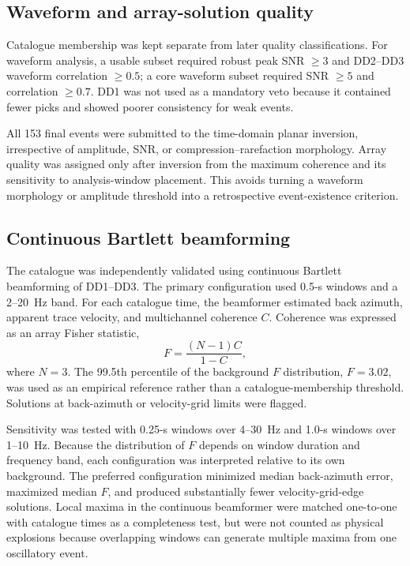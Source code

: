 \documentclass[]{seismica}
\begin{document}
\subsection{Waveform and array-solution quality}

Catalogue membership was kept separate from later quality classifications.
For waveform analysis, a usable subset required robust peak SNR $\geq3$ and
DD2--DD3 waveform correlation $\geq0.5$; a core waveform subset required SNR
$\geq5$ and correlation $\geq0.7$. DD1 was not used as a mandatory veto
because it contained fewer picks and showed poorer consistency for weak
events.

All 153 final events were submitted to the time-domain planar inversion,
irrespective of amplitude, SNR, or compression--rarefaction morphology. Array
quality was assigned only after inversion from the maximum coherence and its
sensitivity to analysis-window placement. This avoids turning a waveform
morphology or amplitude threshold into a retrospective event-existence
criterion.

\subsection{Continuous Bartlett beamforming}

The catalogue was independently validated using continuous Bartlett
beamforming of DD1--DD3. The primary configuration used 0.5-s windows and a
2--20~Hz band. For each catalogue time, the beamformer estimated back azimuth,
apparent trace velocity, and multichannel coherence $C$. Coherence was
expressed as an array Fisher statistic,
\begin{equation}
  F=\frac{(N-1)C}{1-C},
  \label{eq:f_statistic}
\end{equation}
where $N=3$. The 99.5th percentile of the background $F$ distribution,
$F=3.02$, was used as an empirical reference rather than a catalogue-membership
threshold. Solutions at back-azimuth or velocity-grid limits were flagged.

Sensitivity was tested with 0.25-s windows over 4--30~Hz and 1.0-s windows
over 1--10~Hz. Because the distribution of $F$ depends on window duration and
frequency band, each configuration was interpreted relative to its own
background. The preferred configuration minimized median back-azimuth error,
maximized median $F$, and produced substantially fewer velocity-grid-edge
solutions. Local maxima in the continuous beamformer were matched one-to-one
with catalogue times as a completeness test, but were not counted as physical
explosions because overlapping windows can generate multiple maxima from one
oscillatory event.
\end{document}
